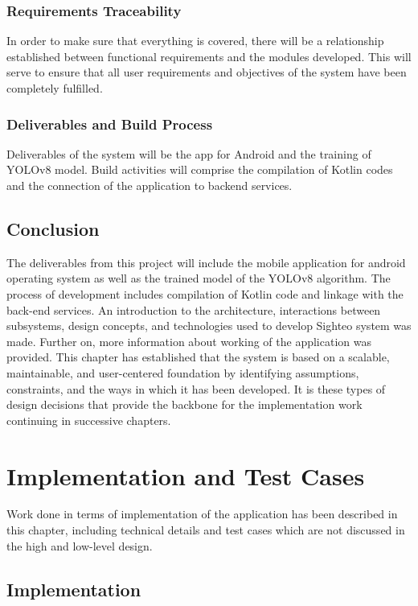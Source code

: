 \documentclass{FastFyp}
\begin{document}
\subsection{Requirements Traceability}
In order to make sure that everything is covered, there will be a relationship established between functional requirements and the modules developed. This will serve to ensure that all user requirements and objectives of the system have been completely fulfilled.

\subsection{Deliverables and Build Process}
Deliverables of the system will be the app for Android and the training of YOLOv8 model. Build activities will comprise the compilation of Kotlin codes and the connection of the application to backend services.

\section{Conclusion}
The deliverables from this project will include the mobile application for android operating system as well as the trained model of the YOLOv8 algorithm. The process of development includes compilation of Kotlin code and linkage with the back-end services. An introduction to the architecture, interactions between subsystems, design concepts, and technologies used to develop Sighteo system was made. Further on, more information about working of the application was provided. This chapter has established that the system is based on a scalable, maintainable, and user-centered foundation by identifying assumptions, constraints, and the ways in which it has been developed. It is these types of design decisions that provide the backbone for the implementation work continuing in successive chapters.

\chapter{Implementation and Test Cases}
Work done in terms of implementation of the application has been described in this chapter, including technical details and test cases which are not discussed in the high and low-level design.
\section{Implementation}
\end{document}
